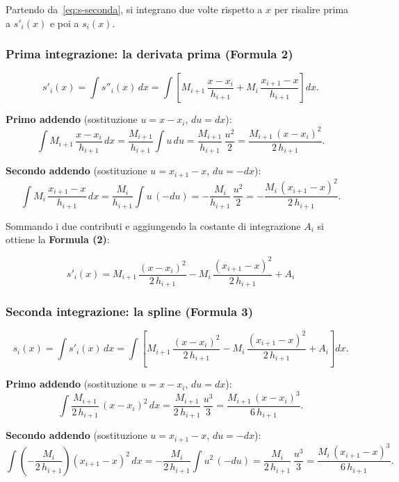 \documentclass[a4paper,12pt]{article}
\theoremstyle{definition}
\theoremstyle{remark}
\begin{document}
Partendo da~\eqref{eq:s-seconda}, si integrano due volte rispetto a $x$
per risalire prima a $s'_i(x)$ e poi a $s_i(x)$.

\subsubsection*{Prima integrazione: la derivata prima (Formula 2)}

\[
  s'_i(x) = \int s''_i(x)\,dx
  = \int \!\left[ M_{i+1}\,\frac{x - x_i}{h_{i+1}}
                + M_i\,\frac{x_{i+1} - x}{h_{i+1}} \right] dx.
\]

\noindent\textbf{Primo addendo} (sostituzione $u = x - x_i$, $du = dx$):
\[
  \int M_{i+1}\,\frac{x - x_i}{h_{i+1}}\,dx
  = \frac{M_{i+1}}{h_{i+1}}\int u\,du
  = \frac{M_{i+1}}{h_{i+1}}\,\frac{u^2}{2}
  = \frac{M_{i+1}\,(x - x_i)^2}{2\,h_{i+1}}.
\]

\noindent\textbf{Secondo addendo} (sostituzione $u = x_{i+1} - x$,
$du = -dx$):
\[
  \int M_i\,\frac{x_{i+1} - x}{h_{i+1}}\,dx
  = \frac{M_i}{h_{i+1}}\int u\,(-du)
  = -\frac{M_i}{h_{i+1}}\,\frac{u^2}{2}
  = -\frac{M_i\,(x_{i+1} - x)^2}{2\,h_{i+1}}.
\]

\noindent Sommando i due contributi e aggiungendo la costante di
integrazione $A_i$ si ottiene la \textbf{Formula (2)}:

\begin{equation}
  \boxed{
    s'_i(x) = M_{i+1}\,\frac{(x - x_i)^2}{2\,h_{i+1}}
             - M_i\,\frac{(x_{i+1} - x)^2}{2\,h_{i+1}} + A_i
  }
  \label{eq:s-prima}
\end{equation}

\subsubsection*{Seconda integrazione: la spline (Formula 3)}

\[
  s_i(x) = \int s'_i(x)\,dx
  = \int\!\left[
      M_{i+1}\,\frac{(x - x_i)^2}{2\,h_{i+1}}
      - M_i\,\frac{(x_{i+1} - x)^2}{2\,h_{i+1}}
      + A_i
    \right] dx.
\]

\noindent\textbf{Primo addendo} (sostituzione $u = x - x_i$, $du = dx$):
\[
  \int \frac{M_{i+1}}{2\,h_{i+1}}\,(x - x_i)^2\,dx
  = \frac{M_{i+1}}{2\,h_{i+1}}\,\frac{u^3}{3}
  = \frac{M_{i+1}\,(x - x_i)^3}{6\,h_{i+1}}.
\]

\noindent\textbf{Secondo addendo} (sostituzione $u = x_{i+1} - x$,
$du = -dx$):
\[
  \int \!\left(-\frac{M_i}{2\,h_{i+1}}\right)(x_{i+1} - x)^2\,dx
  = -\frac{M_i}{2\,h_{i+1}}\int u^2\,(-du)
  = \frac{M_i}{2\,h_{i+1}}\,\frac{u^3}{3}
  = \frac{M_i\,(x_{i+1} - x)^3}{6\,h_{i+1}}.
\]
\end{document}
